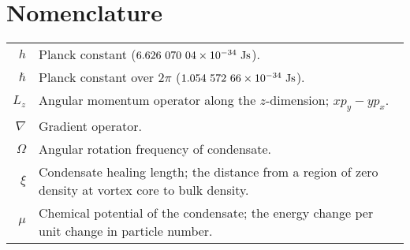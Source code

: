 \chapter*{Nomenclature} 

\begin{longtable}{rl}
$h$ & Planck constant ($6.626\ 070\ 04\times 10^{-34}\ \mbox{Js}$). \\
$\hbar$ & Planck constant over $2\pi$ ($1.054\ 572\ 66\e{-34}\ \mbox{Js}$). \\
$L_z$ & Angular momentum operator along the $z$-dimension; $xp_y-yp_x$. \\
$\nabla$ & Gradient operator. \\
$\Omega$ & Angular rotation frequency of condensate. \\
$\xi$ & Condensate healing length; the distance from a region of zero density at vortex core to bulk density. \\
$\mu$ & Chemical potential of the condensate; the energy change per unit change in particle number. \\
\end{longtable}